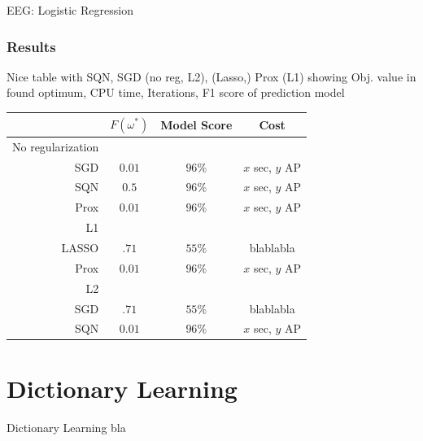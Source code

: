 \documentclass[10pt]{beamer}
\begin{document}
\begin{frame}{EEG: Logistic Regression}
	
\end{frame}

  \begin{frame}\frametitle{Results}
    Nice table with SQN, SGD (no reg, L2), (Lasso,) Prox (L1) showing
    Obj. value in found optimum, CPU time, Iterations, F1 score of prediction model

    \begin{table}[t]
    \centering
      \begin{tabular}{r|c|c|c}
        \phantom 0 & \textbf{$F(\omega^*)$} & \textbf{Model Score} & \textbf{Cost}\\
      \hline \alert{No regularization}   &      & &  \\
        SGD   & $0.01$  & $96\%$  & $x$ sec, $y$ AP\\
        SQN   & $0.5$  & $96\%$  & $x$ sec, $y$ AP\\
        Prox   & $0.01$  & $96\%$  & $x$ sec, $y$ AP\\
      \hline \hline \alert{L1}        &    &   &  \\
      LASSO & $.71$  &  $55\%$ & blablabla \\
        Prox   & $0.01$  & $96\%$  & $x$ sec, $y$ AP\\
      \hline \hline \alert{L2}        &    &   &  \\
       SGD & $.71$  &  $55\%$ & blablabla \\
        SQN   & $0.01$  & $96\%$  & $x$ sec, $y$ AP\\
      \end{tabular}
    \end{table}
  \end{frame}

\section{Dictionary Learning}
\begin{frame}{Dictionary Learning}
	bla
\end{frame}
\end{document}
